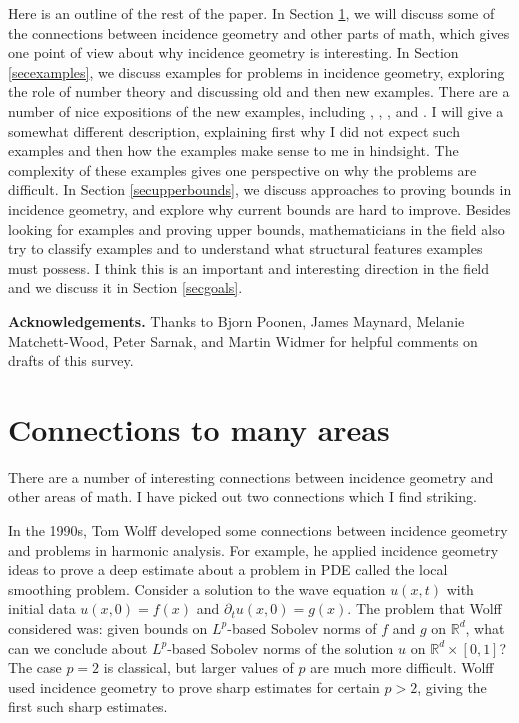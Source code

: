 \documentclass{amsart}
\newcommand{\RR}{\mathbb{R}}
\begin{document}
Here is an outline of the rest of the paper.  In Section \ref{secconnections},  we will discuss some of the connections between incidence geometry and other parts of math,  which gives one point of view about why incidence geometry is interesting.   In Section \ref{secexamples},  we discuss examples for problems in incidence geometry,  exploring the role of number theory and discussing old and then new examples.   There are a number of nice expositions of the new examples, including \cite{ABG+}, \cite{Bl},  \cite{Po}, and \cite{Ta}.  I will give a somewhat different description, explaining first why I did not expect such examples and then how the examples make sense to me in hindsight. 
The complexity of these examples gives one perspective on why the problems are difficult.  In Section \ref{secupperbounds},  we discuss approaches to proving bounds in incidence geometry,  and explore why current bounds are hard to improve.   Besides looking for examples and proving upper bounds, mathematicians in the field also try to classify examples and to understand what structural features examples must possess.  I think this is an important and interesting direction in the field and we discuss it in Section \ref{secgoals}.  

\vskip10pt

{\bf Acknowledgements.}  Thanks to Bjorn Poonen, James Maynard, Melanie Matchett-Wood, Peter Sarnak, and Martin Widmer for helpful comments on drafts of this survey.









\section{Connections to many areas} \label{secconnections}

There are a number of interesting connections between incidence geometry and other areas of math.   I have picked out two connections which I find striking.

In the 1990s, Tom Wolff developed some connections between incidence geometry and problems in harmonic analysis.   For example,  he applied incidence geometry ideas to prove a deep estimate about a problem in PDE called the local smoothing problem.   Consider a solution to the wave equation $u(x,t)$ with initial data $u(x,0) = f(x)$ and $\partial_t u(x,0) = g(x)$.   The problem that Wolff considered was: given bounds on $L^p$-based Sobolev norms of $f$ and $g$ on $\RR^d$,  what can we conclude about $L^p$-based Sobolev norms of the solution $u$ on $\RR^d \times [0,1]$?  The case $p=2$ is classical,  but larger values of $p$ are much more difficult.   Wolff used incidence geometry to prove sharp estimates for certain $p > 2$, giving the first such sharp estimates.
\end{document}
